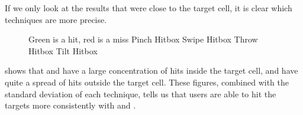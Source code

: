 If we only look at the results that were close to the target cell, it is clear which techniques are more precise. 

\begin{figure}[H]
	\caption{
		Green is a hit, red is a miss
		\protect{} Pinch Hitbox
		\protect{} Swipe Hitbox
		\protect{} Throw Hitbox
		\protect{} Tilt Hitbox
	}
	\label{fig:thitboxes}
\end{figure}

 shows that \swipe and \throw have a large concentration of hits inside the target cell, \pinch and \tilt have quite a spread of hits outside the target cell. These figures, combined with the standard deviation of each technique, tells us that users are able to hit the targets more consistently with \swipe and \throw.

